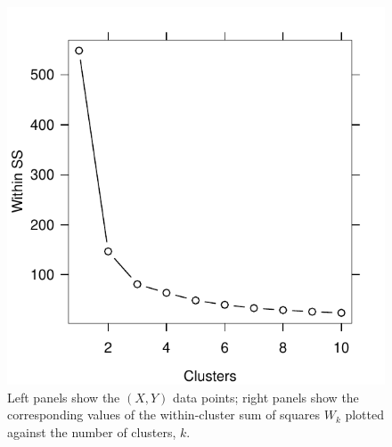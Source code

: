 \documentclass[12pt]{article}
\begin{document}
\begin{figure}
\begin{minipage}{\linewidth}
\begin{minipage}{0.45\linewidth}
  \end{minipage}
  \hspace{0.05in}
  \begin{minipage}{0.45\linewidth}
    \includegraphics[width=\linewidth]{demo/elbow/incorrect-withinss.pdf}
  \end{minipage}
\end{minipage}
\caption{Left panels show the $(X,Y)$ data points; right panels
  show the corresponding values of the within-cluster sum of squares $W_k$
plotted against the number of clusters, $k$.}
\label{fig:elbow}
\end{figure}
\end{document}
